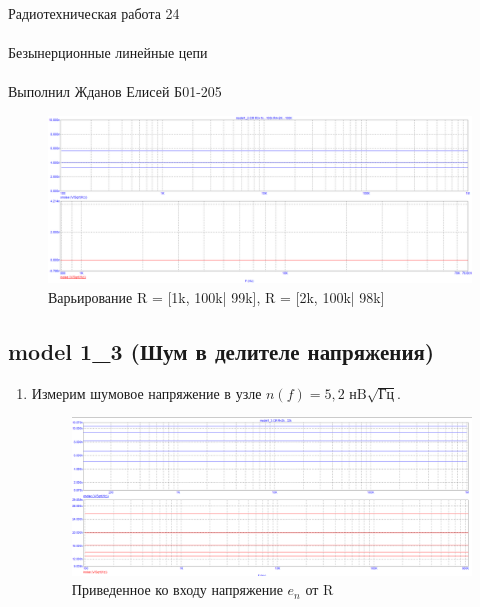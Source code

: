 \documentclass{astroedu-lab}
\begin{document}
\begin{problem}{\huge Радиотехническая работа 24\\\\Безынерционные линейные цепи\\\\Выполнил Жданов Елисей Б01-205}
\begin{enumerate}
\begin{figure}[h!]
    \centering
    \includegraphics[scale=0.3]{images/mod1_2_2.png}
    \caption{Варьирование R = [1k, 100k| 99k], R = [2k, 100k| 98k]}
    \label{fig:1_2_2}
\end{figure}

\end{enumerate}

\subsection*{\textbf{model 1\_3 (Шум в делителе напряжения)}}

\begin{enumerate}

\item

Измерим шумовое напряжение в узле $n(f) = 5,2 \text{ нB}\sqrt{\text{Гц}}$. 


\begin{figure}[h!]
    \centering
    \includegraphics[scale=0.3]{images/mod1_3_1.png}
    \caption{Приведенное ко входу напряжение $e_n$ от R}
    \label{fig:1_3_1}
\end{figure}



\end{enumerate}
\end{problem}
\end{document}
